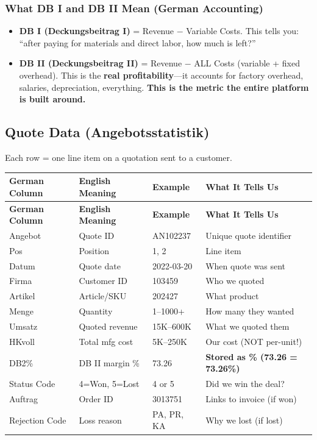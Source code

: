 \documentclass[11pt,a4paper]{article}
\begin{document}
\subsubsection{What DB I and DB II Mean (German Accounting)}

\begin{itemize}
  \item \textbf{DB I (Deckungsbeitrag I)} = Revenue $-$ Variable Costs. This tells you: ``after paying for materials and direct labor, how much is left?''
  \item \textbf{DB II (Deckungsbeitrag II)} = Revenue $-$ ALL Costs (variable + fixed overhead). This is the \textbf{real profitability}---it accounts for factory overhead, salaries, depreciation, everything. \textbf{This is the metric the entire platform is built around.}
\end{itemize}

\subsection{Quote Data (Angebotsstatistik)}

Each row = one line item on a quotation sent to a customer.

\begin{longtable}{p{3cm} p{4cm} p{2.5cm} p{5cm}}
\toprule
\textbf{German Column} & \textbf{English Meaning} & \textbf{Example} & \textbf{What It Tells Us} \\
\midrule
\endfirsthead
\toprule
\textbf{German Column} & \textbf{English Meaning} & \textbf{Example} & \textbf{What It Tells Us} \\
\midrule
\endhead
Angebot & Quote ID & AN102237 & Unique quote identifier \\
Pos & Position & 1, 2 & Line item \\
Datum & Quote date & 2022-03-20 & When quote was sent \\
Firma & Customer ID & 103459 & Who we quoted \\
Artikel & Article/SKU & 202427 & What product \\
Menge & Quantity & 1--1000+ & How many they wanted \\
Umsatz & Quoted revenue & 15K--600K & What we quoted them \\
HKvoll & Total mfg cost & 5K--250K & Our cost (NOT per-unit!) \\
DB2\% & DB II margin \% & 73.26 & \textbf{Stored as \% (73.26 = 73.26\%)} \\
Status Code & 4=Won, 5=Lost & 4 or 5 & Did we win the deal? \\
Auftrag & Order ID & 3013751 & Links to invoice (if won) \\
Rejection Code & Loss reason & PA, PR, KA & Why we lost (if lost) \\
\bottomrule
\end{longtable}
\end{document}

